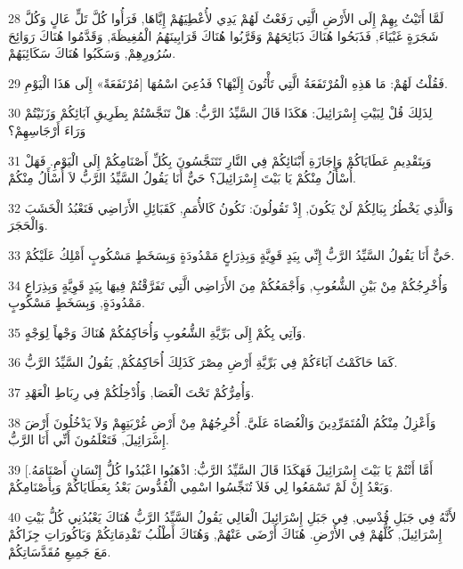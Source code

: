 \par 28 لَمَّا أَتَيْتُ بِهِمْ إِلَى الأَرْضِ الَّتِي رَفَعْتُ لَهُمْ يَدِي لأُعْطِيَهُمْ إِيَّاهَا, فَرَأُوا كُلَّ تَلٍّ عَالٍ وَكُلَّ شَجَرَةٍ غَبْيَاءَ, فَذَبَحُوا هُنَاكَ ذَبَائِحَهُمْ وَقَرَّبُوا هُنَاكَ قَرَابِينَهُمُ الْمُغِيظَةَ, وَقَدَّمُوا هُنَاكَ رَوَائِحَ سُرُورِهِمْ, وَسَكَبُوا هُنَاكَ سَكَائِبَهُمْ.
\par 29 فَقُلْتُ لَهُمْ: مَا هَذِهِ الْمُرْتَفَعَةُ الَّتِي تَأْتُونَ إِلَيْهَا؟ فَدُعِيَ اسْمُهَا [مُرْتَفَعَةً» إِلَى هَذَا الْيَوْمِ.
\par 30 لِذَلِكَ قُلْ لِبَيْتِ إِسْرَائِيلَ: هَكَذَا قَالَ السَّيِّدُ الرَّبُّ: هَلْ تَنَجَّسْتُمْ بِطَرِيقِ آبَائِكُمْ وَزَنَيْتُمْ وَرَاءَ أَرْجَاسِهِمْ؟
\par 31 وَبِتَقْدِيمِ عَطَايَاكُمْ وَإِجَازَةِ أَبْنَائِكُمْ فِي النَّارِ تَتَنَجَّسُونَ بِكُلِّ أَصْنَامِكُمْ إِلَى الْيَوْمِ. فَهَلْ أُسْأَلُ مِنْكُمْ يَا بَيْتَ إِسْرَائِيلَ؟ حَيٌّ أَنَا يَقُولُ السَّيِّدُ الرَّبُّ لاَ أُسْأَلُ مِنْكُمْ.
\par 32 وَالَّذِي يَخْطُرُ بِبَالِكُمْ لَنْ يَكُونَ, إِذْ تَقُولُونَ: نَكُونُ كَالأُمَمِ, كَقَبَائِلِ الأَرَاضِي فَنَعْبُدُ الْخَشَبَ وَالْحَجَرَ.
\par 33 حَيٌّ أَنَا يَقُولُ السَّيِّدُ الرَّبُّ إِنِّي بِيَدٍ قَوِيَّةٍ وَبِذِرَاعٍ مَمْدُودَةٍ وَبِسَخَطٍ مَسْكُوبٍ أَمْلِكُ عَلَيْكُمْ.
\par 34 وَأُخْرِجُكُمْ مِنْ بَيْنِ الشُّعُوبِ, وَأَجْمَعُكُمْ مِنَ الأَرَاضِي الَّتِي تَفَرَّقْتُمْ فِيهَا بِيَدٍ قَوِيَّةٍ وَبِذِرَاعٍ مَمْدُودَةٍ, وَبِسَخَطٍ مَسْكُوبٍ.
\par 35 وَآتِي بِكُمْ إِلَى بَرِّيَّةِ الشُّعُوبِ وَأُحَاكِمُكُمْ هُنَاكَ وَجْهاً لِوَجْهٍ.
\par 36 كَمَا حَاكَمْتُ آبَاءَكُمْ فِي بَرِّيَّةِ أَرْضِ مِصْرَ كَذَلِكَ أُحَاكِمُكُمْ, يَقُولُ السَّيِّدُ الرَّبُّ.
\par 37 وَأُمِرُّكُمْ تَحْتَ الْعَصَا, وَأُدْخِلُكُمْ فِي رِبَاطِ الْعَهْدِ.
\par 38 وَأَعْزِلُ مِنْكُمُ الْمُتَمَرِّدِينَ وَالْعُصَاةَ عَلَيَّ. أُخْرِجُهُمْ مِنْ أَرْضِ غُرْبَتِهِمْ وَلاَ يَدْخُلُونَ أَرْضَ إِسْرَائِيلَ, فَتَعْلَمُونَ أَنِّي أَنَا الرَّبُّ.
\par 39 [أَمَّا أَنْتُمْ يَا بَيْتَ إِسْرَائِيلَ فَهَكَذَا قَالَ السَّيِّدُ الرَّبُّ: اذْهَبُوا اعْبُدُوا كُلُّ إِنْسَانٍ أَصْنَامَهُ. وَبَعْدُ إِنْ لَمْ تَسْمَعُوا لِي فَلاَ تُنَجِّسُوا اسْمِي الْقُدُّوسَ بَعْدُ بِعَطَايَاكُمْ وَبِأَصْنَامِكُمْ.
\par 40 لأَنَّهُ فِي جَبَلِ قُدْسِي, فِي جَبَلِ إِسْرَائِيلَ الْعَالِي يَقُولُ السَّيِّدُ الرَّبُّ هُنَاكَ يَعْبُدُنِي كُلُّ بَيْتِ إِسْرَائِيلَ, كُلُّهُمْ فِي الأَرْضِ. هُنَاكَ أَرْضَى عَنْهُمْ, وَهُنَاكَ أَطْلُبُ تَقْدِمَاتِكُمْ وَبَاكُورَاتِ جِزَاكُمْ مَعَ جَمِيعِ مُقَدَّسَاتِكُمْ.
